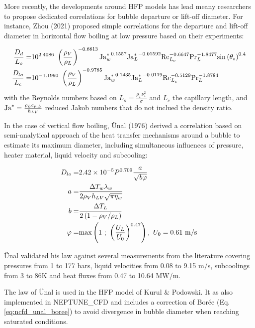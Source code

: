 \npar
More recently, the developments around HFP models has lead meany researchers to propose dedicated correlations for bubble departure or lift-off diameter. For instance, Zhou \etal (2021) \cite{zhou_mechanistic_2021} proposed simple correlations for the departure and lift-off diameter in horizontal flow boiling at low pressure based on their experiments:

\begin{align}
\frac{D_{d}}{L_{o}} =& 10^{2.4086}\ \parth{\frac{\rho_{V}}{\rho_{L}}}^{-0.6613} {\Ja^{*}_{w}}^{0.1557} {\Ja^{*}_{L}}^{-0.01592} \Re_{L_{o}}^{-0.6647} \Pr_{L}^{-1.8477} \sin{\theta_{s}}^{0.4}
\label{eq:dd_zhou}
\\
%
\frac{D_{lo}}{L_{c}} =& 10^{-1.1990}\ \parth{\frac{\rho_{V}}{\rho_{L}}}^{-0.9785} {\Ja^{*}_{w}}^{0.1435} {\Ja^{*}_{L}}^{-0.0119} \Re_{L_{c}}^{-0.5129} \Pr_{L}^{-1.8784}
\label{eq:dlo_zhou}
\end{align}
with the Reynolds numbers based on $L_{o} = \frac{\rho_{L}\nu_{L}^{2}}{\sigma}$ and $L_{c}$ the capillary length, and $\mathrm{Ja}^{*} = \frac{\rho_{L}c_{p,L}}{h_{LV}}$ reduced Jakob numbers that do not inclued the density ratio. 


\npar


In the case of vertical flow boiling, \"Unal (1976)\cite{unal_maximum_1976} derived a correlation based on semi-analytical approach of the heat transfer mechanisms around a bubble to estimate its maximum diameter, including simultaneous influences of pressure, heater material, liquid velocity and subcooling:

\begin{align}
D_{lo}=& 2.42\times 10^{-5} P^{0.709}\frac{a}{\sqrt{b\varphi}}
\label{eq:dlo_unal}
\\
\nonumber a =& \frac{\Delta T_{w}\lambda_{w}}{2\rho_{V}h_{LV}\sqrt{\pi \eta_{w}} }\\
\nonumber b =& \frac{\Delta T_{L}}{2\left( 1-\rho_{V}/\rho_{L} \right)}\\
\nonumber \varphi=& \mathrm{max}\left( 1\ ;\ \left( \frac{U_{L}}{U_{0}} \right)^{0.47} \right),\ U_{0}=0.61~\mathrm{m/s}
\end{align}

\"Unal validated his law against several measurements from the literature covering pressures from 1 to 177 bars, liquid velocities from 0.08 to 9.15 m/s, subcoolings from 3 to 86K and heat fluxes from 0.47 to 10.64 MW/m.


\begin{note*}{}
The law of \"Unal is used in the HFP model of Kurul \& Podowski. It as also implemented in NEPTUNE\_CFD and includes a correction of Borée \etal (Eq. \ref{eq:ncfd_unal_boree}) to avoid divergence in bubble diameter when reaching saturated conditions.
\end{note*}

